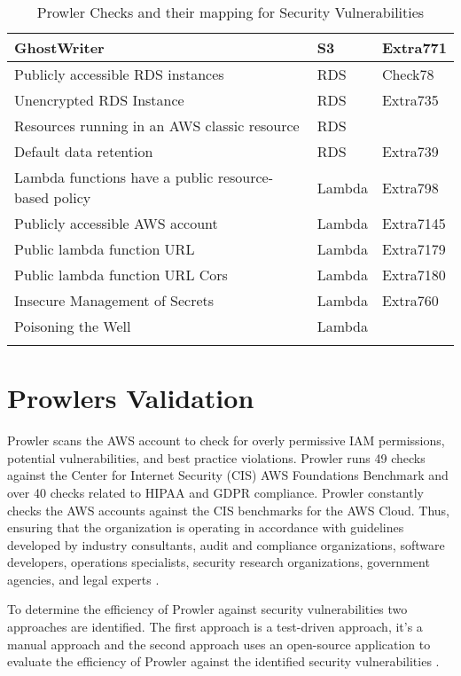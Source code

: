 \begin{longtable}{|p{10cm}|p{2.4cm}|p{2cm}|}
    \hline
    GhostWriter & S3 & Extra771 \\
    \hline
    Publicly accessible RDS instances & RDS & Check78\\
    \hline
    Unencrypted RDS Instance & RDS & Extra735\\
    \hline
    Resources running in an AWS classic resource & RDS & \\
    \hline
    Default data retention & RDS & Extra739\\
    \hline
    Lambda functions have a public resource-based policy & Lambda & Extra798 \\
    \hline
    Publicly accessible AWS account & Lambda & Extra7145 \\
    \hline
    Public lambda function URL & Lambda & Extra7179 \\
    \hline
    Public lambda function URL Cors & Lambda & Extra7180 \\
    \hline
    Insecure Management of Secrets & Lambda & Extra760\\
    \hline
    Poisoning the Well & Lambda & \\
    \hline
    \caption{Prowler Checks and their mapping for Security Vulnerabilities}
    \label{tab:classificationofsecurityvulnerabilities}
\end{longtable}

\section{Prowlers Validation}

\par Prowler scans the AWS account to check for overly permissive IAM permissions, potential vulnerabilities, and best practice violations. Prowler runs 49 checks against the Center for Internet Security (CIS) AWS Foundations Benchmark and over 40 checks related to HIPAA and GDPR compliance. Prowler constantly checks the AWS accounts against the CIS benchmarks for the AWS Cloud. Thus, ensuring that the organization is operating in accordance with guidelines developed by industry consultants, audit and compliance organizations, software developers, operations specialists, security research organizations, government agencies, and legal experts \cite{66}.

\par To determine the efficiency of Prowler against security vulnerabilities two approaches are identified.
The first approach is a test-driven approach, it’s a manual approach and the second approach uses an open-source application to evaluate the efficiency of Prowler against the identified security vulnerabilities \cite{37}.

